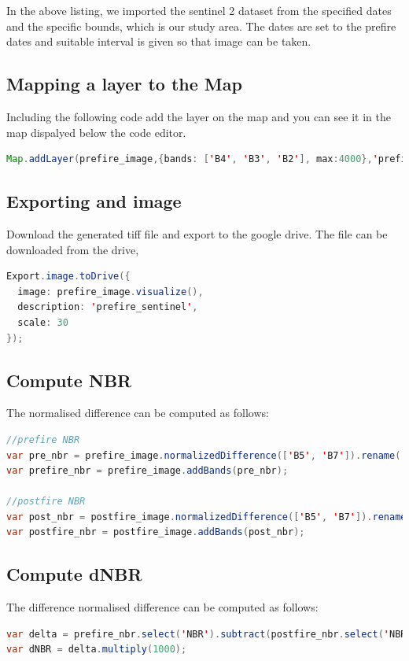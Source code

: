 \documentclass[12pt]{svproc}
\begin{document}
In the above listing, we imported the sentinel 2 dataset from the specified dates and the specific bounds, which is our study area. The dates are set to the prefire dates and suitable interval is given so that image can be taken.

\subsection{Mapping a layer to the Map}

Including the following code add the layer on the map and you can see it in the map dispalyed below the code editor.
\begin{lstlisting}[language=Java, caption=Map Layer]
Map.addLayer(prefire_image,{bands: ['B4', 'B3', 'B2'], max:4000},'prefire_image');
\end{lstlisting}

\subsection{Exporting and image}

Download the generated tiff file and export to the google drive. The file can be downloaded from the drive,
\begin{lstlisting}[language=Java, caption=Export to Drive]
Export.image.toDrive({
  image: prefire_image.visualize(),
  description: 'prefire_sentinel',
  scale: 30
});
\end{lstlisting}

\subsection{Compute NBR}

The normalised difference can be computed as follows:
\begin{lstlisting}[language=Java, caption=Calculate NBR]
//prefire NBR
var pre_nbr = prefire_image.normalizedDifference(['B5', 'B7']).rename('NBR');
var prefire_nbr = prefire_image.addBands(pre_nbr);

//postfire NBR
var post_nbr = postfire_image.normalizedDifference(['B5', 'B7']).rename('NBR');
var postfire_nbr = postfire_image.addBands(post_nbr);
\end{lstlisting}

\subsection{Compute dNBR}

The difference normalised difference can be computed as follows:
\begin{lstlisting}[language=Java, caption=Calculate dNBR]
var delta = prefire_nbr.select('NBR').subtract(postfire_nbr.select('NBR'));
var dNBR = delta.multiply(1000);
\end{lstlisting}
  
\end{document}
